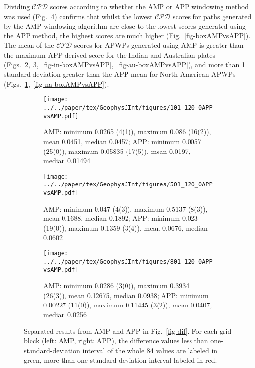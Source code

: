 Dividing $\mathcal{CPD}$ scores according to whether the AMP or APP windowing
method was used (Fig.~\ref{fig-difAMPvsAPP}) confirms that whilst the lowest
$\mathcal{CPD}$ scores for paths generated by the AMP windowing algorithm are
close to the lowest scores generated using the APP method, the highest scores
are much higher (Fig.~\ref{fig-boxAMPvsAPP}). The mean of the $\mathcal{CPD}$
scores for APWPs generated using AMP is greater than the maximum APP-derived
score for the Indian and Australian plates
(Figs.~\ref{fig-in-difAMPvsAPP},~\ref{fig-au-difAMPvsAPP},~\ref{fig-in-boxAMPvsAPP},~\ref{fig-au-boxAMPvsAPP}),
and more than 1 standard deviation greater than the APP mean for North American
APWPs (Figs.~\ref{fig-na-difAMPvsAPP},~\ref{fig-na-boxAMPvsAPP}).

\begin{figure}
  \centering
  \begin{subfigure}{1.01\textwidth}
    \texttt{[image: ../../paper/tex/GeophysJInt/figures/101\_120\_0APPvsAMP.pdf]}
    \caption{AMP\@: minimum 0.0265 (4(1)), maximum 0.086 (16(2)), mean 0.0451,
      median 0.0457; APP\@: minimum 0.0057 (25(0)), maximum 0.05835 (17(5)),
      mean 0.0197, median 0.01494}\label{fig-na-difAMPvsAPP}
  \end{subfigure}
  \vspace{.1em}
  \begin{subfigure}{1.01\textwidth}
    \texttt{[image: ../../paper/tex/GeophysJInt/figures/501\_120\_0APPvsAMP.pdf]}
    \caption{AMP\@: minimum 0.047 (4(3)), maximum 0.5137 (8(3)), mean 0.1688,
      median 0.1892; APP\@: minimum 0.023 (19(0)), maximum 0.1359 (3(4)), mean
      0.0676, median 0.0602}\label{fig-in-difAMPvsAPP}
  \end{subfigure}
  \vspace{.1em}
  \begin{subfigure}{1.01\textwidth}
    \texttt{[image: ../../paper/tex/GeophysJInt/figures/801\_120\_0APPvsAMP.pdf]}
    \caption{AMP\@: minimum 0.0286 (3(0)), maximum 0.3934 (26(3)), mean 0.12675,
      median 0.0938; APP\@: minimum 0.00227 (11(0)), maximum 0.11445 (3(2)),
      mean 0.0407, median 0.0256}\label{fig-au-difAMPvsAPP}
  \end{subfigure}
  \caption[$\mathcal{CPD}$ of each plate's paleomagnetic APWPs vs its FHM
    predicted APWP (AMP vs APP)]{Separated results from AMP and APP in
    Fig.~\ref{fig-dif}. For each grid block (left: AMP, right: APP), the
    difference values less than one-standard-deviation interval of the whole 84
    values are labeled in green, more than one-standard-deviation interval
    labeled in red.}\label{fig-difAMPvsAPP}
\end{figure}

